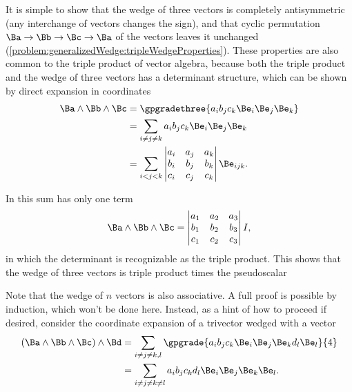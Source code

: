 It is simple to show that the wedge of three vectors is completely antisymmetric (any interchange of vectors changes the sign), and that cyclic permutation \( \Ba \rightarrow \Bb \rightarrow \Bc \rightarrow \Ba \) of the vectors leaves it unchanged
(\cref{problem:generalizedWedge:tripleWedgeProperties}).
These properties are also common to the triple product of  vector algebra, because both the triple product and the wedge of three vectors has a determinant structure,
which can be shown by direct expansion in coordinates
\begin{equation}\label{eqn:generalizedWedge:620}
\begin{aligned}
\Ba \wedge \Bb \wedge \Bc
&= \gpgradethree{ a_i b_j c_k \Be_i \Be_j \Be_k } \\
&= \sum_{i \ne j \ne k} a_i b_j c_k \Be_i \Be_j \Be_k \\
&= \sum_{i < j < k}
   \begin{vmatrix}
   a_i & a_j & a_k \\
   b_i & b_j & b_k \\
   c_i & c_j & c_k \\
   \end{vmatrix}
   \Be_{i j k}.
\end{aligned}
\end{equation}

In  this sum has only one term
\begin{equation}\label{eqn:generalizedWedge:680}
\Ba \wedge \Bb \wedge \Bc
=
\begin{vmatrix}
a_1 & a_2 & a_3 \\
b_1 & b_2 & b_3 \\
c_1 & c_2 & c_3 \\
\end{vmatrix}
I,
\end{equation}
in which the determinant is recognizable as the triple product.  This shows that the  wedge of three vectors is triple product times the pseudoscalar

Note that the wedge of \( n \) vectors is also associative.
A full proof is possible by induction, which won't be done here.
Instead, as a hint of how to proceed if desired,
consider the coordinate expansion of a trivector wedged with a vector
\begin{equation}\label{eqn:generalizedWedge:660}
\begin{aligned}
(\Ba \wedge \Bb \wedge \Bc) \wedge \Bd
&=
\sum_{i \ne j \ne k, l}
\gpgrade{
a_i b_j c_k
\Be_i \Be_j \Be_k
d_l \Be_l
}{4} \\
&=
\sum_{i \ne j \ne k \ne l}
a_i b_j c_k d_l
\Be_i \Be_j \Be_k \Be_l.
\end{aligned}
\end{equation}

